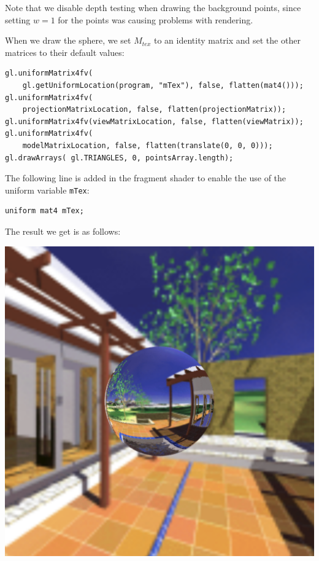 \documentclass[12pt]{article}
\begin{document}
Note that we disable depth testing when drawing the background points, since setting $w = 1$ for the points was causing problems with rendering.

When we draw the sphere, we set $M_{tex}$ to an identity matrix and set the other matrices to their default values:

\begin{verbatim}
gl.uniformMatrix4fv(
    gl.getUniformLocation(program, "mTex"), false, flatten(mat4()));        
gl.uniformMatrix4fv(
    projectionMatrixLocation, false, flatten(projectionMatrix));
gl.uniformMatrix4fv(viewMatrixLocation, false, flatten(viewMatrix));
gl.uniformMatrix4fv(
    modelMatrixLocation, false, flatten(translate(0, 0, 0)));
gl.drawArrays( gl.TRIANGLES, 0, pointsArray.length);
\end{verbatim}

The following line is added in the fragment shader to enable the use of the uniform variable \texttt{mTex}:

\begin{verbatim}
uniform mat4 mTex;
\end{verbatim}

The result we get is as follows:

\begin{center}
\includegraphics[scale=0.4]{images/part2}
\end{center}
\end{document}
